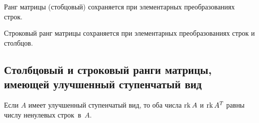 \begin{corollary}
    Ранг матрицы (стобцовый) сохраняется при элементарных преобразованиях строк.
\end{corollary}

\begin{corollary}
    Строковый ранг матрицы сохраняется при элементарных преобразованиях строк и столбцов.
\end{corollary}


\subsection{Столбцовый и строковый ранги матрицы, имеющей улучшенный ступенчатый вид}

\begin{proposal}
    Если $A$ имеет улучшенный ступенчатый вид, то оба числа $\operatorname{\mathop{\mathrm{rk}}} A$ и $\operatorname{\mathop{\mathrm{rk}}} A^T$ равны числу ненулевых строк~в~$A$.
\end{proposal}

